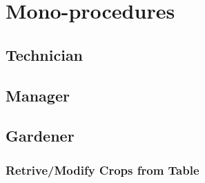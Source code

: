 \break



\section{Mono-procedures}



\subsection{Technician}







\subsection{Manager}
\break




\subsection{Gardener}
\subsubsection{Retrive/Modify Crops from Table}

